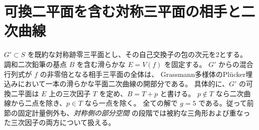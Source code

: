 \section{可換二平面を含む対称三平面の相手と二次曲線}
\label{sec:marked-commuting-plane-fibers}
\begin{theorem}\label{thm:marked-commuting-plane-fibers}
$G'\subset S$ を既約な対称跡零三平面とし、その自己交換子の包の次元を2とする。
調和二次鉛筆の基点 $B$ を含む滑らかな $E=V(f)$ を固定する。
$G'$ からの混合行列式が $f$ の非零倍となる相手三平面の全体は、
Grassmann多様体のPl\"ucker埋込みにおいて一本の滑らかな平面二次曲線の開部分である。
具体的に、$G'$ の可換二平面は $E$ 上の三次因子 $T$ を定め、$B=T+p$ と書ける。
$p\notin T$ なら二次曲線から二点を除き、$p\in T$ なら一点を除く。
全ての解で $g=5$ である。従って前節の固定計量例外も、\emph{対称側の部分空間}
の段階では被約な三角形および重なった三次因子の両方について扱える。
\end{theorem}
